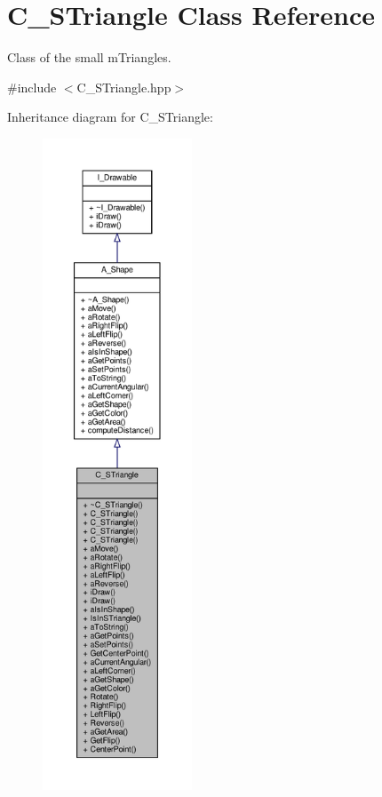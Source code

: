 \hypertarget{classC__STriangle}{}\section{C\+\_\+\+S\+Triangle Class Reference}
\label{classC__STriangle}


Class of the small m\+Triangles.  




{\ttfamily \#include $<$C\+\_\+\+S\+Triangle.\+hpp$>$}



Inheritance diagram for C\+\_\+\+S\+Triangle\+:
\nopagebreak
\begin{figure}[H]
\begin{center}
\leavevmode
\includegraphics[height=550pt]{classC__STriangle__inherit__graph}
\end{center}
\end{figure}


